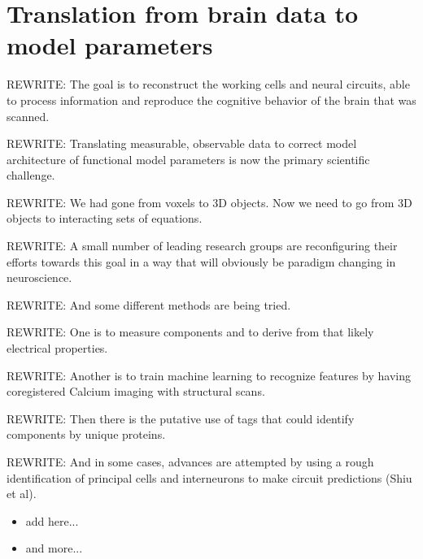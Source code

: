 \documentclass{ldr-article}
\begin{document}
\section{Translation from brain data to model parameters}

\alert{REWRITE:} The goal is to reconstruct the working cells and neural circuits, able to process information and reproduce the cognitive behavior of the brain that was scanned.

\alert{REWRITE:} Translating measurable, observable data to correct model architecture of functional model parameters is now the primary scientific challenge.

\alert{REWRITE:} We had gone from voxels to 3D objects. Now we need to go from 3D objects to interacting sets of equations.

\alert{REWRITE:} A small number of leading research groups are reconfiguring their efforts towards this goal in a way that will obviously be paradigm changing in neuroscience.

\alert{REWRITE:} And some different methods are being tried.

\alert{REWRITE:} One is to measure components and to derive from that likely electrical properties.

\alert{REWRITE:} Another is to train machine learning to recognize features by having coregistered Calcium imaging with structural scans.

\alert{REWRITE:} Then there is the putative use of tags that could identify components by unique proteins.

\alert{REWRITE:} And in some cases, advances are attempted by using a rough identification of principal cells and interneurons to make circuit predictions (Shiu et al).

\begin{itemize}
	\item add here...
	\item and more...
\end{itemize}


\end{document}
